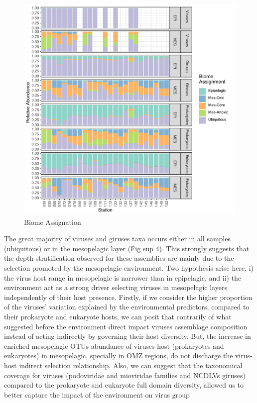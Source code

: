 \documentclass[fleqn,10pt]{wlscirep}
\begin{document}
\begin{figure}[ht]
    \centering
    \includegraphics[scale=0.8]{images/simple_biome_projection_to_print.pdf}
    \caption{Biome Assignation}
    \label{fig:sim_biome}
\end{figure}

The great majority of viruses and giruses taxa occurs either in all samples (ubiquitous) or in the mesopelagic layer (Fig sup 4). This strongly suggests that the depth stratification observed for these assemblies are mainly due to the selection promoted by the mesopelagic environment. Two hypothesis arise here, i) the virus host range in mesopelagic is narrower than in epipelagic, and ii) the environment act as a strong driver selecting viruses in mesopelagic layers independently of their host presence. Firstly, if we consider the higher proportion of the viruses’ variation explained by the environmental predictors, compared to their prokaryote and eukaryote hosts, we can posit that contrarily of what suggested before the environment direct impact viruses assemblage composition instead of acting indirectly by governing their host diversity. But, the increase in enriched mesopelagic OTUs abundance of viruses-host (prokaryotes and eukaryotes) in mesopelagic, specially in OMZ regions, do not discharge the virus-host indirect selection relationship. Also, we can suggest that the taxonomical coverage for viruses (podoviridae and mioviridae families and NCDLVs giruses) compared to the prokaryote and eukaryote full domain diversity, allowed us to better capture the impact of the environment on virus group
\end{document}
